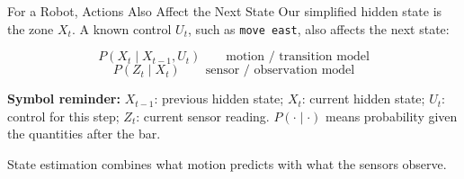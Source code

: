 \documentclass[aspectratio=169,10pt]{beamer}
\newcommand{\equationlegend}[1]{%
  \par\smallskip
  \begingroup
    \setlength{\fboxsep}{5pt}%
    \noindent\colorbox{DeckSoft}{%
      \parbox{\dimexpr\linewidth-2\fboxsep\relax}{%
        \footnotesize\textbf{Symbol reminder:} #1%
      }%
    }\par
  \endgroup
  \smallskip
}
\begin{document}
\begin{frame}[shrink=10]{For a Robot, Actions Also Affect the Next State}
  Our simplified hidden state is the zone $X_t$.
  A known control $U_t$, such as \texttt{move east}, also affects the next state:

  \begin{center}
  \end{center}

  \[
    P(X_t\mid X_{t-1},U_t) \qquad \text{motion / transition model}
  \]
  \[
    P(Z_t\mid X_t) \qquad \text{sensor / observation model}
  \]

  \equationlegend{$X_{t-1}$: previous hidden state; $X_t$: current hidden state; $U_t$: control for this step; $Z_t$: current sensor reading. $P(\cdot\mid\cdot)$ means probability given the quantities after the bar.}

  \begin{keyidea}
    State estimation combines what motion predicts with what the sensors observe.
  \end{keyidea}
\end{frame}
\end{document}
